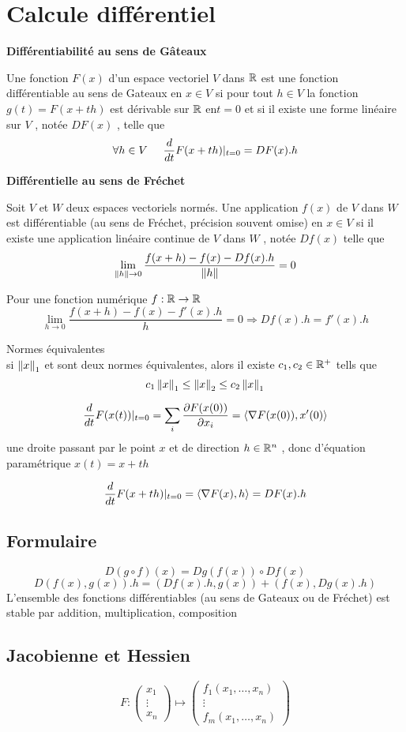 \documentclass[openany]{book}
\begin{document}
\section{Calcule diff\'erentiel}
\textbf{Diff\'erentiabilit\'e au sens de G\^ateaux}
\begin{definition}
Une fonction $F(x)$ d'un espace vectoriel $ V$  dans $\mathbb{R}$ est
une fonction diff\'erentiable au sens de Gateaux en $ x\in V$  si pour tout $ h \in V$  la fonction $ g(t) = F(x+th)$  est d\'erivable sur $\mathbb{R}$ en$
t = 0 $ et si il existe une forme lin\'eaire sur $ V$  , not\'ee $ DF(x)$ , telle que
$$
\forall h \in V \hspace{0.5cm} \frac{d}{d t}F(x+th)|_{t = 0} = DF(x).h
$$
\end{definition}

\textbf{Diff\'erentielle au sens de Fr\'echet}
\begin{definition}
		Soit $V$ et $W$ deux espaces vectoriels norm\'es.
Une application $ f(x)$ de $V$  dans $W$  est diff\'erentiable (au sens de Fr\'echet, pr\'ecision souvent omise) en $x \in V$  si il existe
une application lin\'eaire continue de $V$ dans $W$ , not\'ee $Df(x)$ telle que
$$
\lim_{\left\Vert h\right\Vert\to 0}  \frac{ f(x+h) - f(x) - Df(x).h}{\left\Vert h\right\Vert} = 0
$$
\end{definition}
Pour une fonction num\'erique $f:\mathbb{R} \to \mathbb{R}$
$$
\lim_{h \to 0} \frac{ f(x+h) - f(x) - f'(x).h}{h} = 0 \Rightarrow
Df(x).h = f'(x).h
$$

Normes \'equivalentes \\
si 
$\left\Vert x\right\Vert_1$
et 
sont deux normes \'equivalentes, alors il existe $c_1,c_2 \in \mathbb{R}^+$ tells que
$$
c_1 \left\Vert x\right\Vert_1 \leq \left\Vert x\right\Vert_2 \leq c_2 \left\Vert x\right\Vert_1
$$

$$
\frac{d}{dt}F(x(t))|_{t = 0} 
= \sum_i \frac{\partial F(x(0))}{\partial x_i}
= \langle \nabla F(x(0)) , x'(0)\rangle
$$
une droite passant par le point $x$ et de direction $ h \in \mathbb{R}^n$ , donc d'\'equation param\'etrique $ x(t) = x + th$ 

$$
\frac{d}{dt}F(x+th)|_{t = 0} 
= \langle \nabla F(x) , h\rangle
= DF(x).h
$$

\subsection{Formulaire}
$$ D(g\circ f)(x) = Dg(f(x)) \circ Df(x) $$
$$ D(f(x),g(x)).h = (Df(x).h, g(x)) + (f(x), Dg(x).h)$$
L'ensemble des fonctions diff\'erentiables (au sens de Gateaux ou de Fr\'echet) est stable par addition, multiplication, composition

\subsection{Jacobienne et Hessien}
$$
F :
\begin{pmatrix}
	x_1\\\vdots\\x_n
\end{pmatrix} 
\longmapsto 
\begin{pmatrix}
f_1(x_1,\dots,x_n)\\
\vdots\\
f_m(x_1,\dots,x_n)
\end{pmatrix}
$$
\end{document}
